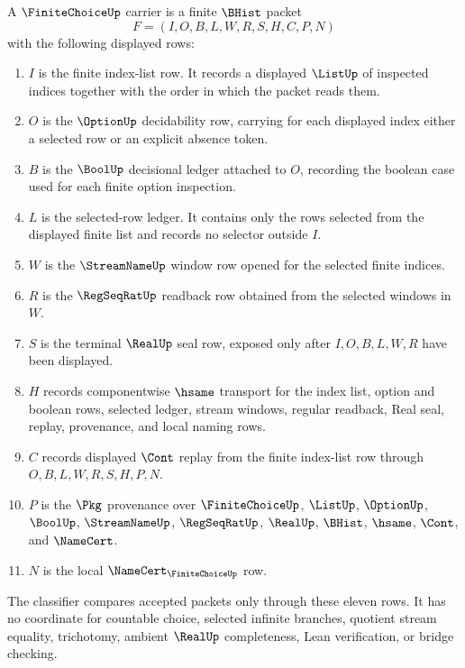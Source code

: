 \begin{definition}
\label{def:finite-choice-carrier}
A $\FiniteChoiceUp$ carrier is a finite $\BHist$ packet
$$
F=(I,O,B,L,W,R,S,H,C,P,N)
$$
with the following displayed rows:
\begin{enumerate}
\item $I$ is the finite index-list row. It records a displayed $\ListUp$ of inspected indices together with the order in which the packet reads them.
\item $O$ is the $\OptionUp$ decidability row, carrying for each displayed index either a selected row or an explicit absence token.
\item $B$ is the $\BoolUp$ decisional ledger attached to $O$, recording the boolean case used for each finite option inspection.
\item $L$ is the selected-row ledger. It contains only the rows selected from the displayed finite list and records no selector outside $I$.
\item $W$ is the $\StreamNameUp$ window row opened for the selected finite indices.
\item $R$ is the $\RegSeqRatUp$ readback row obtained from the selected windows in $W$.
\item $S$ is the terminal $\RealUp$ seal row, exposed only after $I,O,B,L,W,R$ have been displayed.
\item $H$ records componentwise $\hsame$ transport for the index list, option and boolean rows, selected ledger, stream windows, regular readback, Real seal, replay, provenance, and local naming rows.
\item $C$ records displayed $\Cont$ replay from the finite index-list row through $O,B,L,W,R,S,H,P,N$.
\item $P$ is the $\Pkg$ provenance over $\FiniteChoiceUp$, $\ListUp$, $\OptionUp$, $\BoolUp$, $\StreamNameUp$, $\RegSeqRatUp$, $\RealUp$, $\BHist$, $\hsame$, $\Cont$, and $\NameCert$.
\item $N$ is the local $\NameCert_{\FiniteChoiceUp}$ row.
\end{enumerate}
The classifier compares accepted packets only through these eleven rows. It has no coordinate for countable choice, selected infinite branches, quotient stream equality, trichotomy, ambient $\RealUp$ completeness, Lean verification, or bridge checking.
\end{definition}

